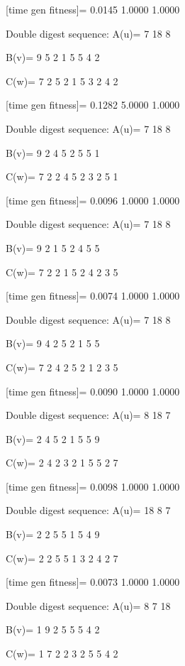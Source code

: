 [time gen fitness]=
    0.0145    1.0000    1.0000

Double digest sequence:
A(u)=
     7    18     8

B(v)=
     9     5     2     1     5     5     4     2

C(w)=
     7     2     5     2     1     5     3     2     4     2

[time gen fitness]=
    0.1282    5.0000    1.0000

Double digest sequence:
A(u)=
     7    18     8

B(v)=
     9     2     4     5     2     5     5     1

C(w)=
     7     2     2     4     5     2     3     2     5     1

[time gen fitness]=
    0.0096    1.0000    1.0000

Double digest sequence:
A(u)=
     7    18     8

B(v)=
     9     2     1     5     2     4     5     5

C(w)=
     7     2     2     1     5     2     4     2     3     5

[time gen fitness]=
    0.0074    1.0000    1.0000

Double digest sequence:
A(u)=
     7    18     8

B(v)=
     9     4     2     5     2     1     5     5

C(w)=
     7     2     4     2     5     2     1     2     3     5

[time gen fitness]=
    0.0090    1.0000    1.0000

Double digest sequence:
A(u)=
     8    18     7

B(v)=
     2     4     5     2     1     5     5     9

C(w)=
     2     4     2     3     2     1     5     5     2     7

[time gen fitness]=
    0.0098    1.0000    1.0000

Double digest sequence:
A(u)=
    18     8     7

B(v)=
     2     2     5     5     1     5     4     9

C(w)=
     2     2     5     5     1     3     2     4     2     7

[time gen fitness]=
    0.0073    1.0000    1.0000

Double digest sequence:
A(u)=
     8     7    18

B(v)=
     1     9     2     5     5     5     4     2

C(w)=
     1     7     2     2     3     2     5     5     4     2

